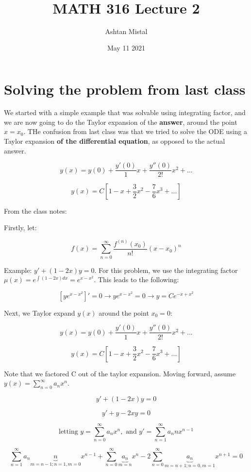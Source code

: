 \documentclass{article}
\title{MATH 316 Lecture 2}
\author{Ashtan Mistal}
\date{May 11 2021}
\begin{document}
\ifstandalone
\maketitle
\fi

\graphicspath{{./Lecture02/}}

\section{Solving the problem from last class}

We started with a simple example that was solvable using integrating factor, and we are now going to do the Taylor expansion of the \textbf{answer}, around the point $x = x_0$. THe confusion from last class was that we tried to solve the ODE using a Taylor expansion \textbf{of the differential equation}, as opposed to the actual answer. 

$$y(x) = y(0) + \frac{y'(0)}{1} x + \frac{y''(0)}{2!} x^2 + ...$$

$$y(x) = C \left[1 - x + \frac{3}{2} x^2 - \frac{7}{6} x^3 + ... \right]$$

From the class notes:


Firstly, let:

$$f(x) = \sum_{n = 0}^\infty \frac{f^{(n)} (x_0)}{n!} (x - x_0)^n$$

Example: $y' + (1-2x) y = 0$. For this problem, we use the integrating factor $\mu(x) = e^{\int (1-2x) dx} = e^{x - x^2}$. This leads to the following:

$$\left[ y e^{x - x^2} \right]' = 0 \to y e^{x - x^2} = 0 \to y = C e^{-x + x^2}$$

Next, we Taylor expand $y(x)$ around the point $x_0 = 0$:

$$y(x) = y(0) + \frac{y'(0)}{1} x + \frac{y''(0)}{2!} x^2 + ...$$

$$y(x) = C \left[ 1-x+\frac{3}{2} x^2 - \frac{7}{6} x^3 + ... \right]$$


Note that we factored C out of the taylor expansion. Moving forward, assume $y(x) = \sum_{n = 0}^{\infty} a_n x^n$. 

$$y' + (1 - 2x) y = 0$$

$$y' + y - 2xy = 0$$

$$\text{letting } y = \sum_{n = 0}^{\infty} a_n x^n, \text{ and } y' = \sum_{n = 1}^{\infty} a_n n x^{n-1}$$

$$\sum_{n = 1}^{\infty} a_n \underbrace{n}_{m = n-1; n = 1, m = 0} x^{n-1} + \sum_{n = 0}^{\infty} \underbrace{a_n}_{m = n} x^n - 2 \sum_{n = 0}^{\infty} \underbrace{a_n}_{m = n+1;  n = 0, m = 1} x^{n+1} = 0$$
\end{document}
